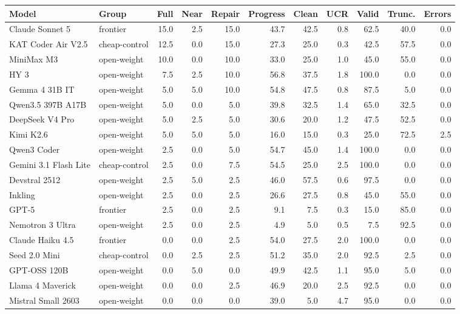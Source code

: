 \begin{longtable}{llrrrrrrrrr}
\toprule
Model & Group & Full & Near & Repair & Progress & Clean & UCR & Valid & Trunc. & Errors \\
\midrule
\endhead
Claude Sonnet 5 & frontier & 15.0 & 2.5 & 15.0 & 43.7 & 42.5 & 0.8 & 62.5 & 40.0 & 0.0 \\
KAT Coder Air V2.5 & cheap-control & 12.5 & 0.0 & 15.0 & 27.3 & 25.0 & 0.3 & 42.5 & 57.5 & 0.0 \\
MiniMax M3 & open-weight & 10.0 & 0.0 & 10.0 & 33.0 & 25.0 & 1.0 & 45.0 & 55.0 & 0.0 \\
HY 3 & open-weight & 7.5 & 2.5 & 10.0 & 56.8 & 37.5 & 1.8 & 100.0 & 0.0 & 0.0 \\
Gemma 4 31B IT & open-weight & 5.0 & 5.0 & 10.0 & 54.8 & 47.5 & 0.8 & 87.5 & 5.0 & 0.0 \\
Qwen3.5 397B A17B & open-weight & 5.0 & 0.0 & 5.0 & 39.8 & 32.5 & 1.4 & 65.0 & 32.5 & 0.0 \\
DeepSeek V4 Pro & open-weight & 5.0 & 2.5 & 5.0 & 30.6 & 20.0 & 1.2 & 47.5 & 52.5 & 0.0 \\
Kimi K2.6 & open-weight & 5.0 & 5.0 & 5.0 & 16.0 & 15.0 & 0.3 & 25.0 & 72.5 & 2.5 \\
Qwen3 Coder & open-weight & 2.5 & 0.0 & 5.0 & 54.7 & 45.0 & 1.4 & 100.0 & 0.0 & 0.0 \\
Gemini 3.1 Flash Lite & cheap-control & 2.5 & 0.0 & 7.5 & 54.5 & 25.0 & 2.5 & 100.0 & 0.0 & 0.0 \\
Devstral 2512 & open-weight & 2.5 & 5.0 & 2.5 & 46.0 & 57.5 & 0.6 & 97.5 & 0.0 & 0.0 \\
Inkling & open-weight & 2.5 & 0.0 & 2.5 & 26.6 & 27.5 & 0.8 & 45.0 & 55.0 & 0.0 \\
GPT-5 & frontier & 2.5 & 0.0 & 2.5 & 9.1 & 7.5 & 0.3 & 15.0 & 85.0 & 0.0 \\
Nemotron 3 Ultra & open-weight & 2.5 & 0.0 & 2.5 & 4.9 & 5.0 & 0.5 & 7.5 & 92.5 & 0.0 \\
Claude Haiku 4.5 & frontier & 0.0 & 0.0 & 2.5 & 54.0 & 27.5 & 2.0 & 100.0 & 0.0 & 0.0 \\
Seed 2.0 Mini & cheap-control & 0.0 & 2.5 & 2.5 & 51.2 & 35.0 & 2.0 & 92.5 & 2.5 & 0.0 \\
GPT-OSS 120B & open-weight & 0.0 & 5.0 & 0.0 & 49.9 & 42.5 & 1.1 & 95.0 & 5.0 & 0.0 \\
Llama 4 Maverick & open-weight & 0.0 & 0.0 & 2.5 & 46.9 & 20.0 & 2.5 & 92.5 & 0.0 & 0.0 \\
Mistral Small 2603 & open-weight & 0.0 & 0.0 & 0.0 & 39.0 & 5.0 & 4.7 & 95.0 & 0.0 & 0.0 \\

\end{longtable}
